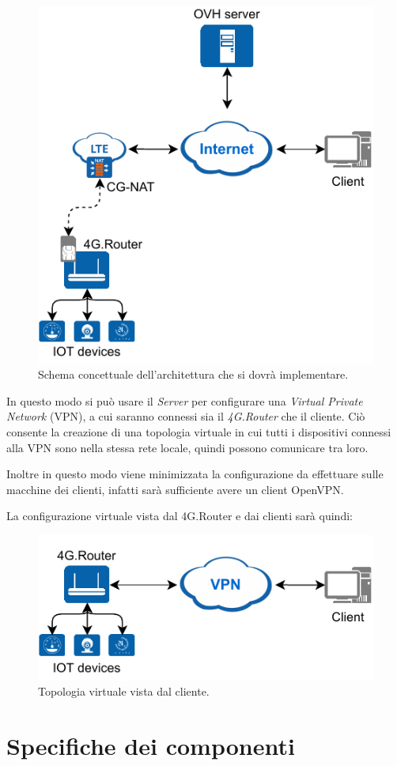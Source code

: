 \begin{figure}[H]
	\centering
	\includegraphics[width=0.5\linewidth]{immagini/diag-real}
	\caption{Schema concettuale dell'architettura che si dovrà implementare.}
	\label{fig:schem_architettura_reale}
\end{figure}

In questo modo si può usare il \textit{Server} per configurare una \textit{Virtual Private Network} (VPN), a cui saranno connessi sia il \textit{4G.Router} che il cliente. Ciò consente la creazione di una topologia virtuale in cui tutti i dispositivi connessi alla VPN sono nella stessa rete locale, quindi possono comunicare tra loro.

Inoltre in questo modo viene minimizzata la configurazione da effettuare sulle macchine dei clienti, infatti sarà sufficiente avere un client OpenVPN.

La configurazione virtuale vista dal 4G.Router e dai clienti sarà quindi:

\begin{figure}[H]
	\centering
	\includegraphics[width=0.5\linewidth]{immagini/diag-virtual}
	\caption{Topologia virtuale vista dal cliente.}
	\label{fig:schema_architettura_virtuale}
\end{figure}


\section{Specifiche dei componenti }

